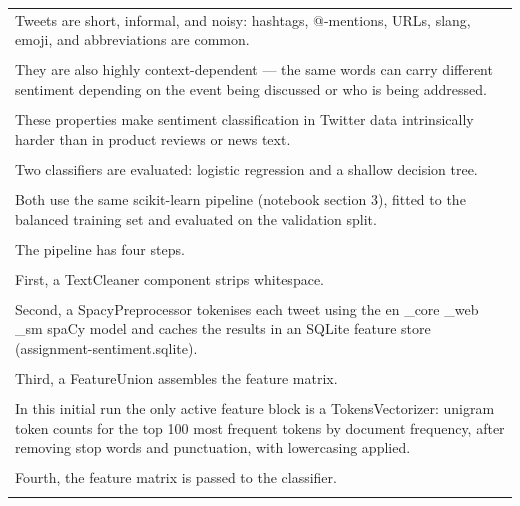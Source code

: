 \documentclass[11pt]{article}
\begin{document}
\begin{longtable}{|p{\dimexpr\linewidth-2\tabcolsep-2\arrayrulewidth\relax}|}
\hline
\rule{0pt}{3.5cm} \\
\hline
Tweets are short, informal, and noisy: hashtags, @-mentions, URLs, slang, emoji, and abbreviations are common. \\[2pt]
\hline
\rule{0pt}{3.5cm} \\
\hline
They are also highly context-dependent --- the same words can carry different sentiment depending on the event being discussed or who is being addressed. \\[2pt]
\hline
\rule{0pt}{3.5cm} \\
\hline
These properties make sentiment classification in Twitter data intrinsically harder than in product reviews or news text. \\[2pt]
\hline
\rule{0pt}{3.5cm} \\
\hline
Two classifiers are evaluated: logistic regression and a shallow decision tree. \\[2pt]
\hline
\rule{0pt}{3.5cm} \\
\hline
Both use the same scikit-learn pipeline (notebook section 3), fitted to the balanced training set and evaluated on the validation split. \\[2pt]
\hline
\rule{0pt}{3.5cm} \\
\hline
The pipeline has four steps. \\[2pt]
\hline
\rule{0pt}{3.5cm} \\
\hline
First, a TextCleaner component strips whitespace. \\[2pt]
\hline
\rule{0pt}{3.5cm} \\
\hline
Second, a SpacyPreprocessor tokenises each tweet using the en \_core \_web \_sm spaCy model and caches the results in an SQLite feature store (assignment-sentiment.sqlite). \\[2pt]
\hline
\rule{0pt}{3.5cm} \\
\hline
Third, a FeatureUnion assembles the feature matrix. \\[2pt]
\hline
\rule{0pt}{3.5cm} \\
\hline
In this initial run the only active feature block is a TokensVectorizer: unigram token counts for the top 100 most frequent tokens by document frequency, after removing stop words and punctuation, with lowercasing applied. \\[2pt]
\hline
\rule{0pt}{3.5cm} \\
\hline
Fourth, the feature matrix is passed to the classifier. \\[2pt]
\hline
\rule{0pt}{3.5cm} \\

\end{longtable}
\end{document}
